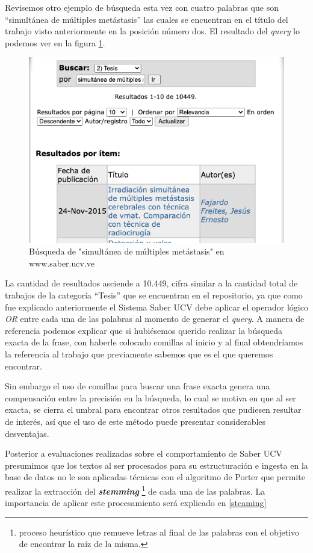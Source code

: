\documentclass[
  10,
  openany]{book}
\begin{document}
Revisemos otro ejemplo de búsqueda esta vez con cuatro palabras que son ``simultánea de múltiples metástasis'' las cuales se encuentran en el título del trabajo visto anteriormente en la posición número dos. El resultado del \emph{query} lo podemos ver en la figura \ref{fig:busquedasaber2}.

\begin{figure}

{\centering \includegraphics[width=0.6\linewidth]{images/01-intro/texto_saber} 

}

\caption{Búsqueda de "simultánea de múltiples metástasis" en www.saber.ucv.ve}\label{fig:busquedasaber2}
\end{figure}

La cantidad de resultados asciende a 10.449, cifra similar a la cantidad total de trabajos de la categoría ``Tesis'' que se encuentran en el repositorio, ya que como fue explicado anteriormente el Sistema Saber UCV debe aplicar el operador lógico \emph{OR} entre cada una de las palabras al momento de generar el \emph{query}. A manera de referencia podemos explicar que si hubiésemos querido realizar la búsqueda exacta de la frase, con haberle colocado comillas al inicio y al final obtendríamos la referencia al trabajo que previamente sabemos que es el que queremos encontrar.

Sin embargo el uso de comillas para buscar una frase exacta genera una compensación entre la precisión en la búsqueda, lo cual se motiva en que al ser exacta, se cierra el umbral para encontrar otros resultados que pudiesen resultar de interés, así que el uso de este método puede presentar considerables desventajas.

Posterior a evaluaciones realizadas sobre el comportamiento de Saber UCV presumimos que los textos al ser procesados para su estructuración e ingesta en la base de datos no le son aplicadas técnicas con el algoritmo de Porter que permite realizar la extracción del \textbf{\emph{stemming}} \footnote{proceso heurístico que remueve letras al final de las palabras con el objetivo de encontrar la raíz de la misma.} de cada una de las palabras. La importancia de aplicar este procesamiento será explicado en \ref{steaming}
\end{document}
